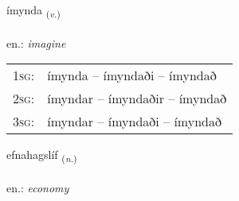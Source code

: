 \documentclass[frontgrid, backgrid]{flacards}\usepackage[]{graphicx}\usepackage[]{xcolor}
\begin{document}
\renewcommand{\flhead}{\vskip5pt \fboxsep=0pt {\small\bfseries\footnotesize Sagnorð | Verb}}
\renewcommand{\fcfoot}{\vskip5pt \fboxsep=0pt \hspace{2pt}{\small\bfseries\footnotesize 2K}}

\renewcommand{\blhead}{\vskip5pt {\small\bfseries\footnotesize Sagnorð | Verb }}
\renewcommand{\bcfoot}{\vskip5pt \hspace{2pt}{\small\bfseries\footnotesize 2K}}


{ímynda \small{\textsubscript{(\textit{v.})}} \\[1ex] %
\textphonetic{[iːmɪnta]} \\
en.: \emph{imagine} \\  [2ex]
\renewcommand*{\arraystretch}{0.8}
\begin{tabular}{p{1cm}l}
\textsc{1sg}: & ímynda -- ímyndaði -- ímyndað \\ 
\textsc{2sg}: & ímyndar -- ímyndaðir -- ímyndað \\ 
\textsc{3sg}: & ímyndar -- ímyndaði -- ímyndað \\ 
\end{tabular}
}

\renewcommand{\flhead}{\vskip5pt \fboxsep=0pt {\small\bfseries\footnotesize Nafnorð | Noun}}
\renewcommand{\fcfoot}{\vskip5pt \fboxsep=0pt \hspace{2pt}{\small\bfseries\footnotesize 2K}}

\renewcommand{\blhead}{\vskip5pt {\small\bfseries\footnotesize Nafnorð | Noun }}
\renewcommand{\bcfoot}{\vskip5pt \hspace{2pt}{\small\bfseries\footnotesize 2K}}


{efnahagslíf \small{\textsubscript{(\textit{n.})}} \\[1ex] %
\textphonetic{[ɛpnahaxstliv]} \\
en.: \emph{economy} \\  [2ex]
\renewcommand*{\arraystretch}{0.8}
}
\end{document}
